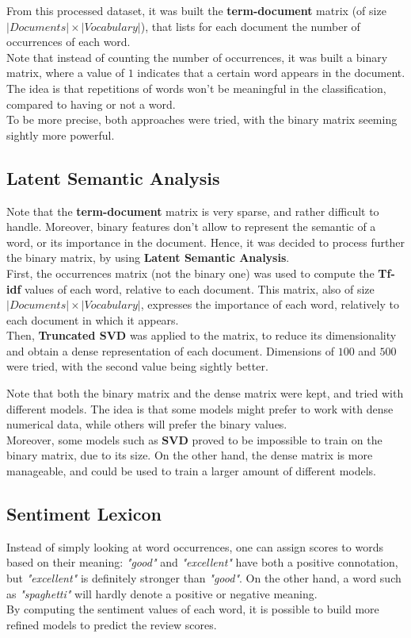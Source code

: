 \documentclass[
12pt,
a4paper,
oneside,
headinclude,
footinclude]{article}
\theoremstyle{definition} %
\begin{document}
From this processed dataset, it was built the \textbf{term-document} matrix (of size $|Documents| \times |Vocabulary|$), that lists for each document the number of occurrences of each word.\\
Note that instead of counting the number of occurrences, it was built a binary matrix, where a value of $1$ indicates that a certain word appears in the document. The idea is that repetitions of words won't be meaningful in the classification, compared to having or not a word. \\
To be more precise, both approaches were tried, with the binary matrix seeming sightly more powerful.\\

\subsection{Latent Semantic Analysis}

Note that the \textbf{term-document} matrix is very sparse, and rather difficult to handle. Moreover, binary features don't allow to represent the semantic of a word, or its importance in the document. Hence, it was decided to process further the binary matrix, by using \textbf{Latent Semantic Analysis}. \\
First, the occurrences matrix (not the binary one) was used to compute the \textbf{Tf-idf} values of each word, relative to each document. This matrix, also of size $|Documents| \times |Vocabulary|$, expresses the importance of each word, relatively to each document in which it appears.\\
Then, \textbf{Truncated SVD} was applied to the matrix, to reduce its dimensionality and obtain a dense representation of each document. Dimensions of $100$ and $500$ were tried, with the second value being sightly better.

Note that both the binary matrix and the dense matrix were kept, and tried with different models. The idea is that some models might prefer to work with dense numerical data, while others will prefer the binary values.\\
Moreover, some models such as \textbf{SVD} proved to be impossible to train on the binary matrix, due to its size. On the other hand, the dense matrix is more manageable, and could be used to train a larger amount of different models.

\subsection{Sentiment Lexicon}
Instead of simply looking at word occurrences, one can assign scores to words based on their meaning: \textit{"good"} and \textit{"excellent"} have both a positive connotation, but \textit{"excellent"} is definitely stronger than \textit{"good"}. On the other hand, a word such as \textit{"spaghetti"} will hardly denote a positive or negative meaning.\\
By computing the sentiment values of each word, it is possible to build more refined models to predict the review scores.
\end{document}
